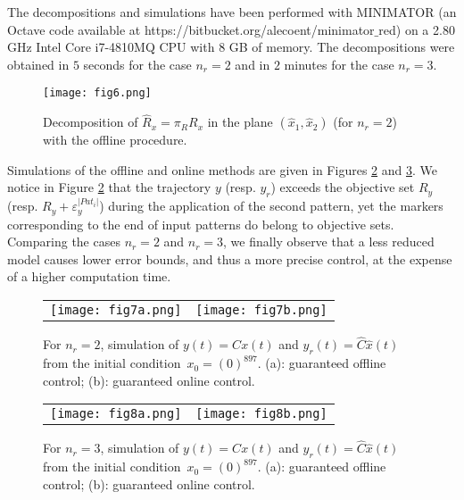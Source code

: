 The decompositions and simulations have been performed with MINIMATOR 
(an Octave code available at https://bitbucket.org/alecoent/minimator$\_$red)
on a 2.80 GHz Intel Core i7-4810MQ CPU with 8 GB of memory.
The decompositions were obtained in $5$ seconds for the case $n_r=2$ and in $2$ minutes
for the case $n_r=3$.

\begin{figure}[ht]
 \centering
 \texttt{[image: fig6.png]}
\caption{Decomposition of $\hat R_x = \pi_R R_x$ in the plane 
$(\hat x_1, \hat x_2)$ (for $n_r=2$) with the offline procedure.}
\label{fig:fig6}
\end{figure}


Simulations of the offline and online methods are given in Figures \ref{fig:fig7}
and \ref{fig:fig8}. 
We notice in Figure \ref{fig:fig7} that the trajectory $y$ (resp. $y_r$) exceeds the objective set 
$R_y$ (resp. $R_y + \varepsilon_y^{\vert Pat_i \vert}$) during the application of the second pattern,
yet the markers corresponding to the end of input patterns do belong to objective sets.
Comparing the cases $n_r=2$ and $n_r=3$, we finally observe that a less reduced model 
causes lower error bounds, and thus a more precise control, at the expense of a higher computation time.





\begin{figure}[ht!]
\centering
 \begin{tabular}{cc} 
 \texttt{[image: fig7a.png]}
 & 
 \texttt{[image: fig7b.png]}
 \end{tabular}
 \caption{For $n_r=2$, simulation of $y(t) = Cx(t)$ and $y_r(t) = \hat C \hat x(t)$ 
 from the initial condition~$x_0=(0)^{897}$. (a): guaranteed offline control; (b): guaranteed online control.}
 \label{fig:fig7}
\end{figure}
  
\begin{figure}[ht!]
\centering
 \begin{tabular}{cc} 
 \texttt{[image: fig8a.png]}
 & 
 \texttt{[image: fig8b.png]}
 \end{tabular}
 \caption{For $n_r=3$, simulation of $y(t) = Cx(t)$ and $y_r(t) = \hat C \hat x(t)$ 
 from the initial condition~$x_0=(0)^{897}$. (a): guaranteed offline control; (b): guaranteed online control.}
 \label{fig:fig8}
\end{figure}  
  
